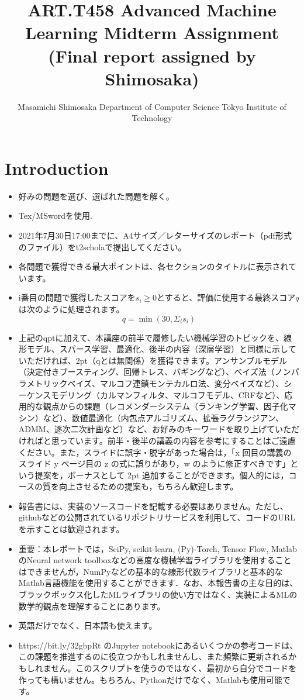 \documentclass{jsarticle}
\title{ART.T458 Advanced Machine Learning Midterm Assignment
(Final report assigned by Shimosaka)}
\author{Masamichi Shimosaka
Department of Computer Science Tokyo Institute of Technology}
\begin{document}
\maketitle
\section*{Introduction}
\begin{itemize}
  \item 好みの問題を選び、選ばれた問題を解く。
  \item Tex/MSwordを使用.
  \item 2021年7月30日17:00までに、A4サイズ／レターサイズのレポート（pdf形式のファイル）をt2scholaで提出してください。
  \item 各問題で獲得できる最大ポイントは、各セクションのタイトルに表示されています。
  \item i番目の問題で獲得したスコアを$s_i \ge 0$とすると、評価に使用する最終スコア$q$は次のように処理されます。
$$q = \min(30,\Sigma_i s_i)$$
  \item 上記のqptに加えて、本講座の前半で履修したい機械学習のトピックを、線形モデル、スパース学習、最適化、後半の内容（深層学習）と同様に示していただければ、2pt（qとは無関係）を獲得できます。アンサンブルモデル（決定付きブースティング、回帰トレス、バギングなど）、ベイズ法（ノンパラメトリックベイズ、マルコフ連鎖モンテカルロ法、変分ベイズなど）、シーケンスモデリング（カルマンフィルタ、マルコフモデル、CRFなど）、応用的な観点からの課題（レコメンダーシステム（ランキング学習、因子化マシン）など）、数値最適化（内包点アルゴリズム、拡張ラグランジアン、ADMM、逐次二次計画など）など、お好みのキーワードを取り上げていただければと思っています。前半・後半の講義の内容を参考にすることはご遠慮ください。また，スライドに誤字・脱字があった場合は，「x 回目の講義のスライド y ページ目の z の式に誤りがあり，w のように修正すべきです」という提案を，ボーナスとして 2pt 追加することができます。個人的には，コースの質を向上させるための提案も，もちろん歓迎します。
  \item 報告書には、実装のソースコードを記載する必要はありません。ただし、githubなどの公開されているリポジトリサービスを利用して、コードのURLを示すことは歓迎されます。
  \item 重要：本レポートでは，SciPy, scikit-learn, (Py)-Torch, Tensor Flow, MatlabのNeural network toolboxなどの高度な機械学習ライブラリを使用することはできませんが，NumPyなどの基本的な線形代数ライブラリと基本的なMatlab言語機能を使用することができます．なお、本報告書の主な目的は、ブラックボックス化したMLライブラリの使い方ではなく、実装によるMLの数学的観点を理解することにあります。
  \item 英語だけでなく、日本語も使えます。
  \item https://bit.ly/32gbpRt のJupyter notebookにあるいくつかの参考コードは、この課題を推進するのに役立つかもしれませんし、また頻繁に更新されるかもしれません。このスクリプトを使うのではなく、最初から自分でコードを作っても構いません。もちろん、Pythonだけでなく、Matlabも使用可能です。


\end{itemize}
\end{document}
